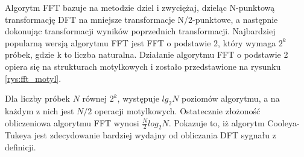 Algorytm FFT bazuje na metodzie dziel i zwyciężaj, dzieląc N-punktową transformację DFT na mniejsze transformacje N/2-punktowe, a następnie dokonując transformacji wyników poprzednich transformacji. Najbardziej popularną wersją algorytmu FFT jest FFT o podstawie 2, który wymaga $2^{k}$ próbek, gdzie k to liczba naturalna. Działanie algorytmu FFT o podstawie 2 opiera się na strukturach motylkowych i zostało przedstawione na rysunku \ref{rys:fft_motyl}.

Dla liczby próbek $N$ równej $2^{k}$, występuje $lg_{2}N$ poziomów algorytmu, a na każdym z nich jest $N/2$ operacji motylkowych. Ostatecznie złożoność obliczeniowa algorytmu FFT wynosi $\frac{N}{2}log_{2}N$. Pokazuje to, iż algorytm Cooleya-Tukeya jest zdecydowanie bardziej wydajny od obliczania DFT sygnału z definicji.
